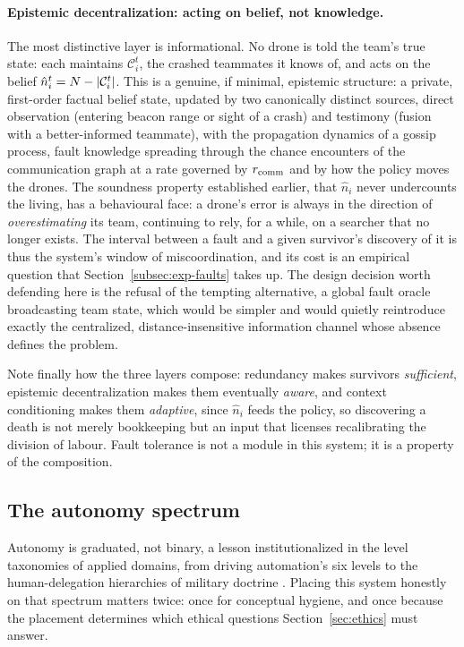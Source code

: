 \paragraph{Epistemic decentralization: acting on belief, not knowledge.}
The most distinctive layer is informational. No drone is told the team's true
state: each maintains $\mathcal{C}_i^t$, the crashed teammates it knows of, and
acts on the belief $\hat n_i^t = N - |\mathcal{C}_i^t|$. This is a
genuine, if minimal, epistemic structure: a private, first-order factual belief
state, updated by two canonically distinct sources, direct observation (entering
beacon range or sight of a crash) and testimony (fusion with a better-informed
teammate), with the propagation dynamics of a gossip process, fault knowledge
spreading through the chance encounters of the communication graph at a rate
governed by $r_{\mathrm{comm}}$ and by how the policy moves the drones. The soundness
property established earlier, that $\hat n_i$ never undercounts the living, has a
behavioural face: a drone's error is always in the direction of
\emph{overestimating} its team, continuing to rely, for a while, on a searcher
that no longer exists. The interval between a fault and a given survivor's
discovery of it is thus the system's window of miscoordination, and its cost is
an empirical question that Section~\ref{subsec:exp-faults} takes up. The design
decision worth defending here is the refusal of the tempting alternative, a
global fault oracle broadcasting team state, which would be simpler and would
quietly reintroduce exactly the centralized, distance-insensitive information
channel whose absence defines the problem.

Note finally how the three layers compose: redundancy makes survivors
\emph{sufficient}, epistemic decentralization makes them eventually \emph{aware},
and context conditioning makes them \emph{adaptive}, since $\hat n_i$ feeds the
policy, so discovering a death is not merely bookkeeping but an input that
licenses recalibrating the division of labour. Fault tolerance is not a module in
this system; it is a property of the composition.

\subsection{The autonomy spectrum}
\label{subsec:mas-autonomy}

Autonomy is graduated, not binary, a lesson institutionalized in the level
taxonomies of applied domains, from driving automation's six levels
\citep{sae2021j3016} to the human-delegation hierarchies of military doctrine
\citep{dod2012autonomy}. Placing this system honestly on that spectrum matters
twice: once for conceptual hygiene, and once because the placement determines
which ethical questions Section~\ref{sec:ethics} must answer.

